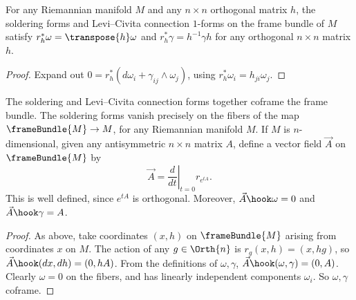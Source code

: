 \begin{lemma}
For any Riemannian manifold \(M\) and any \(n \times n\) orthogonal matrix \(h\), the soldering forms and Levi--Civita connection \(1\)-forms on the frame bundle of \(M\) satisfy \(r_h^* \omega = \transpose{h} \omega\) and \(r_h^* \gamma = h^{-1} \gamma h\) for any orthogonal \(n \times n\) matrix \(h\).
\end{lemma}
\begin{proof}
Expand out \(0=r_h^*(d\omega_i+\gamma_{ij} \wedge\omega_j)\), using \(r_h^*\omega_i=h_{ji} \omega_j\).
\end{proof}
\begin{lemma}
The soldering and Levi--Civita connection forms together coframe the frame bundle.
The soldering forms vanish precisely on the fibers of the map \(\frameBundle{M} \to M\), for any Riemannian manifold \(M\).
If \(M\) is \(n\)-dimensional, given any antisymmetric \(n\times n\) matrix \(A\), define a vector field \(\vec{A}\) on \(\frameBundle{M}\) by
\[
\vec{A}=\left.\frac{d}{dt}\right|_{t=0} r_{e^{tA}}.
\]
This is well defined, since \(e^{tA}\) is orthogonal.
Moreover, \(\vec{A}\hook\omega=0\) and \(\vec{A}\hook\gamma=A\).
\end{lemma}
\begin{proof}
As above, take coordinates \((x,h)\) on \(\frameBundle{M}\) arising from coordinates \(x\) on \(M\).
The action of any \(g \in \Orth{n}\) is \(r_g(x,h)=(x,hg)\), so \(\vec{A}\hook (dx,dh)=(0,hA)\).
From the definitions of \(\omega,\gamma\), \(\vec{A} \hook (\omega,\gamma)=(0,A)\).
Clearly \(\omega=0\) on the fibers, and has linearly independent components \(\omega_i\).
So \(\omega,\gamma\) coframe.
\end{proof}


